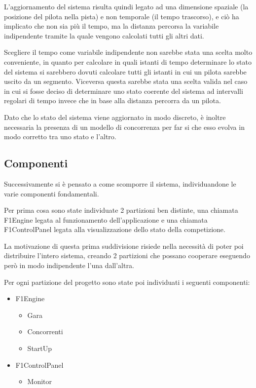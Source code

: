 \documentclass[a4paper,11pt, twoside, openright]{book}
\begin{document}
	L'aggiornamento del sistema risulta quindi legato ad una dimensione spaziale (la posizione del pilota nella pista)
	e non temporale (il tempo trascorso), e ciò ha implicato
	che non sia più il tempo, ma la distanza percorsa la variabile indipendente tramite 
	la quale vengono calcolati tutti gli altri dati.
	
	Scegliere il tempo come variabile indipendente non sarebbe stata una scelta molto conveniente, in quanto per
	calcolare in quali istanti di tempo determinare lo stato del sistema si sarebbero dovuti calcolare
	tutti gli istanti in cui un pilota sarebbe uscito da un segmento. Viceversa questa sarebbe stata una scelta
	valida nel caso in cui si fosse deciso di determinare uno stato coerente del sistema ad intervalli regolari
	di tempo invece che in base alla distanza percorra da un pilota.
	
	Dato che lo stato del sistema viene aggiornato in modo discreto, è inoltre necessaria la presenza di un modello
	di concorrenza per far si che esso evolva in modo corretto tra uno stato e l'altro.
	
      \subsection{Componenti}
	Successivamente si è pensato a come scomporre il sistema, individuandone le varie componenti fondamentali.
      
	Per prima cosa sono state individuate 2 partizioni ben distinte, una chiamata F1Engine legata al 
	funzionamento dell'applicazione e una chiamata F1ControlPanel legata alla visualizzazione dello stato della competizione.
	
	La motivazione di questa prima suddivisione risiede nella necessità di poter poi distribuire l'intero sistema,
	creando 2 partizioni che possano cooperare eseguendo però in modo indipendente l'una dall'altra.
	
	Per ogni partizione del progetto sono state poi individuati i seguenti componenti:
	
	\begin{itemize}
	  \item F1Engine
	  \begin{itemize}
	    \item Gara 
	    \item Concorrenti
	    \item StartUp
	  \end{itemize}
	  \item F1ControlPanel
	  \begin{itemize}
	    \item Monitor
	  \end{itemize}
	\end{itemize}
	
\end{document}
